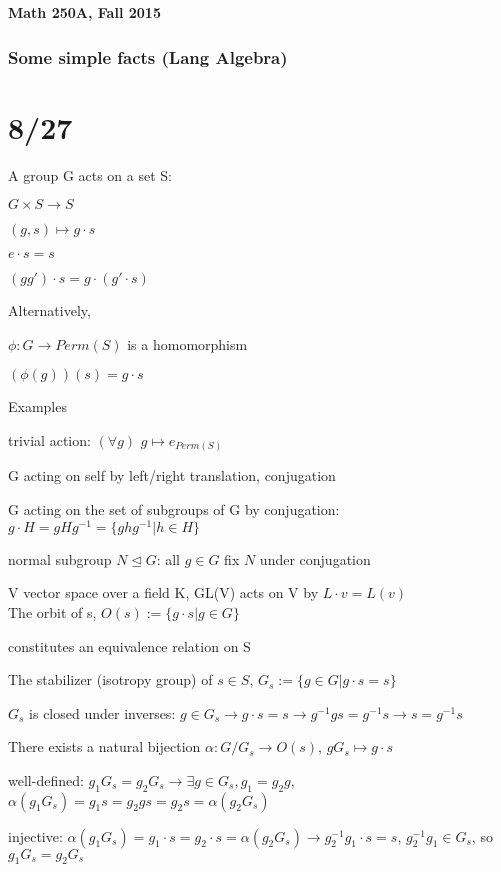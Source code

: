 \documentclass[12pt]{article}
\begin{document}
\noindent
\textbf{Math 250A, Fall 2015}

\subsubsection{Some simple facts (Lang Algebra)}

\noindent


\section{8/27}

\noindent
A group G acts on a set S:

$G \times S \to S$

$(g, s) \mapsto g \cdot s$

$e \cdot s = s$

$(g g') \cdot s = g \cdot (g' \cdot s)$

\noindent
Alternatively,

$\phi: G \to Perm(S)$ is a homomorphism

$(\phi(g))(s) = g \cdot s$

\noindent
Examples

trivial action: $(\forall g)$ $g \mapsto e_{Perm(S)}$

G acting on self by left/right translation, conjugation

G acting on the set of subgroups of G by conjugation: $g \cdot H = gHg^{-1} = \{ghg^{-1} | h \in H\}$

normal subgroup $N \trianglelefteq G$: all $g \in G$ fix $N$ under conjugation

V vector space over a field K, GL(V) acts on V by $L \cdot v = L(v)$\\

\noindent
The orbit of s, $O(s) := \{g \cdot s | g \in G\}$

constitutes an equivalence relation on S

\noindent
The stabilizer (isotropy group) of $s \in S$, $G_s := \{g \in G |g \cdot s = s\}$

$G_s$ is closed under inverses: $g \in G_s \to g \cdot s = s \to g^{-1}gs = g^{-1}s \to s = g^{-1}s$

\noindent
There exists a natural bijection $\alpha: G/G_s \to O(s)$, $gG_s \mapsto g \cdot s$

well-defined: $g_1G_s = g_2G_s \to \exists g \in G_s, g_1 = g_2g$, $\alpha(g_1G_s) = g_1s = g_2 g s = g_2 s = \alpha(g_2G_s)$

injective: $\alpha(g_1G_s) = g_1 \cdot s = g_2 \cdot s = \alpha(g_2G_s) \to g_2^{-1}g_1 \cdot s = s$, $g_2^{-1}g_1 \in G_s$, so $g_1G_s = g_2G_s$\\
\end{document}
